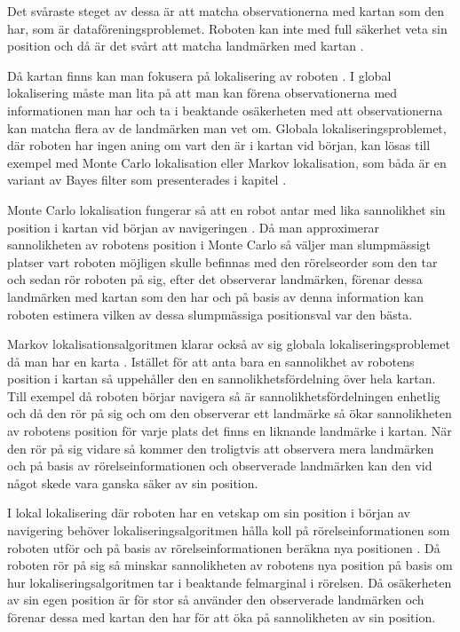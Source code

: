 Det svåraste steget av dessa är att matcha observationerna med kartan som den har, som är dataföreningsproblemet. Roboten kan inte med full säkerhet veta sin position och då är det svårt att matcha landmärken med kartan \citep{982903}.

Då kartan finns kan man fokusera på lokalisering av roboten \citep{982903}. I global lokalisering måste man lita på att man kan förena observationerna med informationen man har och ta i beaktande osäkerheten med att observationerna kan matcha flera av de landmärken man vet om. Globala lokaliseringsproblemet, där roboten har ingen aning om vart den är i kartan vid början, kan lösas till exempel med Monte Carlo lokalisation eller Markov lokalisation, som båda är en variant av Bayes filter som presenterades i kapitel  \citep{ProbabilisticRobotics}. 

Monte Carlo lokalisation fungerar så att en robot antar med lika sannolikhet sin position i kartan vid början av navigeringen \citep{montecarlo}. Då man approximerar sannolikheten av robotens position i Monte Carlo så väljer man slumpmässigt platser vart roboten möjligen skulle befinnas med den rörelseorder som den tar och sedan rör roboten på sig, efter det observerar landmärken, förenar dessa landmärken med kartan som den har och på basis av denna information kan roboten estimera vilken av dessa slumpmässiga positionsval var den bästa. 

Markov lokalisationsalgoritmen klarar också av sig globala lokaliseringsproblemet då man har en karta \citep{ProbabilisticRobotics}. Istället för att anta bara en sannolikhet av robotens position i kartan så uppehåller den en sannolikhetsfördelning över hela kartan. Till exempel då roboten börjar navigera så är sannolikhetsfördelningen enhetlig och då den rör på sig och om den observerar ett landmärke så ökar sannolikheten av robotens position för varje plats det finns en liknande landmärke i kartan. När den rör på sig vidare så kommer den troligtvis att observera mera landmärken och på basis av rörelseinformationen och observerade landmärken kan den vid något skede vara ganska säker av sin position.

I lokal lokalisering där roboten har en vetskap om sin position i början av navigering behöver lokaliseringsalgoritmen hålla koll på rörelseinformationen som roboten utför och på basis av rörelseinformationen beräkna nya positionen \citep{montecarlo,ProbabilisticRobotics}. Då roboten rör på sig så minskar sannolikheten av robotens nya position på basis om hur lokaliseringsalgoritmen tar i beaktande felmarginal i rörelsen. Då osäkerheten av sin egen position är för stor så använder den observerade landmärken och förenar dessa med kartan den har för att öka på sannolikheten av sin position. 

